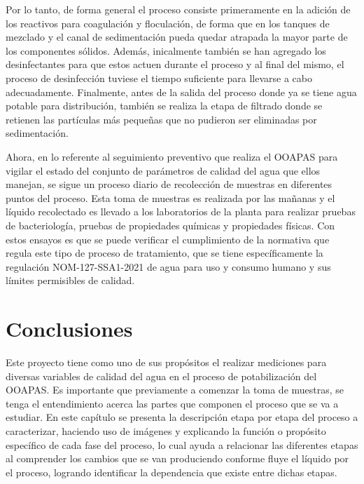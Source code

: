 Por lo tanto, de forma general el proceso consiste primeramente en la adición de los reactivos para coagulación y floculación, de forma que en los tanques de mezclado y el canal de 
sedimentación pueda quedar atrapada la mayor parte de los componentes sólidos. Además, inicalmente también se han agregado los desinfectantes para que estos actuen durante el proceso
y al final del mismo, el proceso de desinfección tuviese el tiempo suficiente para llevarse a cabo adecuadamente. Finalmente, antes de la salida del proceso donde ya se tiene agua potable para 
distribución, también se realiza la etapa de filtrado donde se retienen las partículas más pequeñas que no pudieron ser eliminadas por sedimentación.

Ahora, en lo referente al seguimiento preventivo que realiza el OOAPAS para vigilar el estado del conjunto de parámetros de calidad del agua que ellos manejan, se sigue un proceso diario de recolección de muestras en diferentes 
puntos del proceso. Esta toma de muestras es realizada por las mañanas y el líquido recolectado es llevado a los laboratorios de la planta para realizar pruebas de bacteriología, pruebas de propiedades químicas y propiedades 
físicas. Con estos ensayos es que se puede verificar el cumplimiento de la normativa que regula este tipo de proceso de tratamiento, que se tiene específicamente la regulación NOM-127-SSA1-2021 de agua para uso y consumo 
humano y sus límites permisibles de calidad.

\section{Conclusiones}

Este proyecto tiene como uno de sus propósitos el realizar mediciones para diversas variables de calidad del agua en el proceso de potabilización del OOAPAS. Es importante que previamente a comenzar la toma de muestras, 
se tenga el entendimiento acerca las partes que componen el proceso que se va a estudiar. En este capítulo se presenta la descripción etapa por etapa del proceso a caracterizar, haciendo uso de imágenes y explicando la función 
o propósito específico de cada fase del proceso, lo cual ayuda a relacionar las diferentes etapas al comprender los cambios que se van produciendo conforme fluye el líquido por el proceso, logrando identificar la dependencia 
que existe entre dichas etapas.
